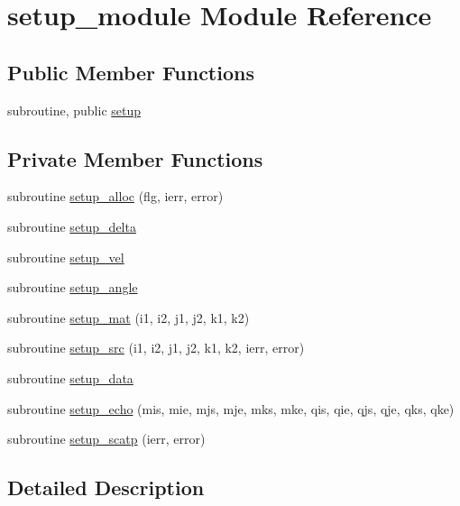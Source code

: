 \hypertarget{classsetup__module}{\section{setup\-\_\-module Module Reference}
\label{classsetup__module}
}
\subsection*{Public Member Functions}
\begin{DoxyCompactItemize}
\item 
subroutine, public \hyperlink{classsetup__module_a302c0c32f6276d487ccd246981c5a4f6}{setup}
\end{DoxyCompactItemize}
\subsection*{Private Member Functions}
\begin{DoxyCompactItemize}
\item 
subroutine \hyperlink{classsetup__module_a7fa1b271cf77ca1416f6421a57fb3533}{setup\-\_\-alloc} (flg, ierr, error)
\item 
subroutine \hyperlink{classsetup__module_a056c9f3cb41e4205ef97af53f6eb1a43}{setup\-\_\-delta}
\item 
subroutine \hyperlink{classsetup__module_a1ca835a5c592e2d2084252cc3fb7c19b}{setup\-\_\-vel}
\item 
subroutine \hyperlink{classsetup__module_a272a99aaea9895d7d7baee2985cfaed2}{setup\-\_\-angle}
\item 
subroutine \hyperlink{classsetup__module_acf400f64b6ae6d7e3914101ce752632c}{setup\-\_\-mat} (i1, i2, j1, j2, k1, k2)
\item 
subroutine \hyperlink{classsetup__module_ab719a152a3290e747a78d8cd7a0bd9f4}{setup\-\_\-src} (i1, i2, j1, j2, k1, k2, ierr, error)
\item 
subroutine \hyperlink{classsetup__module_a1780e88c878f925e9165c350b636957b}{setup\-\_\-data}
\item 
subroutine \hyperlink{classsetup__module_a4e4f5096991d7611f949f66b0a70268d}{setup\-\_\-echo} (mis, mie, mjs, mje, mks, mke, qis, qie, qjs, qje, qks, qke)
\item 
subroutine \hyperlink{classsetup__module_a33ddf34647e1aa158c6d3a1e96fbd3f6}{setup\-\_\-scatp} (ierr, error)
\end{DoxyCompactItemize}


\subsection{Detailed Description}


